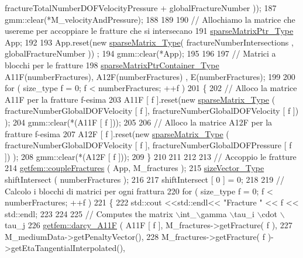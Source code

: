 \begin{DoxyCode}
      fractureTotalNumberDOFVelocityPressure + globalFractureNumber ));
187     gmm::clear(*M\_velocityAndPressure);
188 
189     
190     \textcolor{comment}{// Allochiamo la matrice che usereme per accoppiare le fratture che si intersecano}
191     \hyperlink{Core_8h_a87137a9501b38c724ac80bc955164bb7}{sparseMatrixPtr\_Type}  App;
192 
193     App.reset(\textcolor{keyword}{new} \hyperlink{Core_8h_afba9f623673e2ae32054015bdb5500f9}{sparseMatrix\_Type}( fractureNumberIntersections , globalFractureNumber ))
      ;
194     gmm::clear(*App);
195 
196     
197     \textcolor{comment}{// Matrici a blocchi per le fratture}
198     \hyperlink{Core_8h_a2f5e086fbce840d40be38c016488fd91}{sparseMatrixPtrContainer\_Type} A11F(numberFractures), A12F(numberFractures)
      , E(numberFractures);
199 
200     \textcolor{keywordflow}{for} ( size\_type f = 0; f < numberFractures; ++f )
201     \{
202         \textcolor{comment}{// Alloco la matrice A11F per la fratture f-esima}
203         A11F [ f ].reset(\textcolor{keyword}{new} \hyperlink{Core_8h_afba9f623673e2ae32054015bdb5500f9}{sparseMatrix\_Type} ( fractureNumberGlobalDOFVelocity [ f ], 
      fractureNumberGlobalDOFVelocity [ f ]) );
204         gmm::clear(*(A11F [ f ]));
205 
206         \textcolor{comment}{// Alloco la matrice A12F per la fratture f-esima}
207         A12F [ f ].reset(\textcolor{keyword}{new} \hyperlink{Core_8h_afba9f623673e2ae32054015bdb5500f9}{sparseMatrix\_Type} ( fractureNumberGlobalDOFVelocity [ f ], 
      fractureNumberGlobalDOFPressure [ f ]) );
208         gmm::clear(*(A12F [ f ]));
209     \}
210 
211  
212     
213     \textcolor{comment}{// Accoppio le fratture}
214     \hyperlink{namespacegetfem_a9a0b9f7498668cda8b547b10ac914a34}{getfem::coupleFractures} ( App, M\_fractures );
215     \hyperlink{Core_8h_a83c51913d041a5001e8683434c09857f}{sizeVector\_Type} shiftIntersect ( numberFractures );
216     
217     shiftIntersect [ 0 ] = 0;
218     
219     \textcolor{comment}{// Calcolo i blocchi di matrici per ogni frattura}
220     \textcolor{keywordflow}{for} ( size\_type f = 0; f < numberFractures; ++f )
221     \{
222         std::cout <<std::endl<< \textcolor{stringliteral}{"Fracture "} << f << std::endl;
223 
224         
225         \textcolor{comment}{// Computes the matrix \(\backslash\)int\_\(\backslash\)gamma \(\backslash\)tau\_i \(\backslash\)cdot \(\backslash\)tau\_j}
226         \hyperlink{namespacegetfem_aba6f1b4f1d395aae3d96071cad4953a2}{getfem::darcy\_A11F} ( A11F [ f ], M\_fractures->getFracture( f ),
227                              M\_mediumData->getPenaltyVector(),
228                              M\_fractures->getFracture( f )->getEtaTangentialInterpolated(),

\end{DoxyCode}
